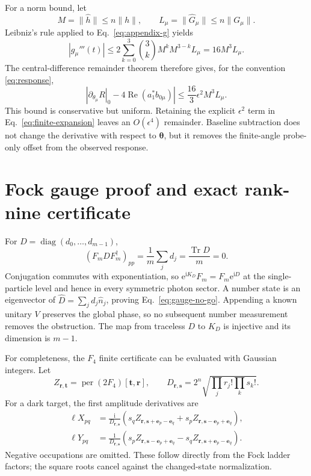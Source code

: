 \documentclass[aps,pra,reprint,amsmath,amssymb,superscriptaddress,longbibliography]{revtex4-2}
\newcommand{\ii}{\mathrm{i}}
\newcommand{\ee}{\mathrm{e}}
\newcommand{\per}{\operatorname{per}}
\newcommand{\Tr}{\operatorname{Tr}}
\newcommand{\btheta}{\bm{\theta}}
\newcommand{\be}{\bm e}
\begin{document}
For a norm bound, let
\begin{equation}
 M=\|\widehat h\|\leq n\|h\|,\qquad
 L_\mu=\|\widehat G_\mu\|\leq n\|G_\mu\|.
\end{equation}
Leibniz's rule applied to Eq.~\eqref{eq:appendix-g} yields
\begin{equation}
 |g_\mu'''(t)|
 \leq2\sum_{k=0}^{3}\binom3kM^kM^{3-k}L_\mu
 =16M^3L_\mu .
\end{equation}
The central-difference remainder theorem therefore gives, for the
convention \eqref{eq:response},
\begin{equation}
 \left|
 \left.\partial_{\theta_\mu}R\right|_0
 -4\operatorname{Re}(a_1^*b_{0\mu})
 \right|
 \leq\frac{16}{3}\epsilon^2M^3L_\mu .
\label{eq:finite-bound}
\end{equation}
This bound is conservative but uniform.  Retaining the explicit
$\epsilon^2$ term in Eq.~\eqref{eq:finite-expansion} leaves an
$O(\epsilon^4)$ remainder.  Baseline subtraction does not change the
derivative with respect to $\btheta$, but it removes the finite-angle
probe-only offset from the observed response.

\section{Fock gauge proof and exact rank-nine certificate}
\label{app:fock-certificate}

For $D=\operatorname{diag}(d_0,\ldots,d_{m-1})$,
\begin{equation}
 (F_mDF_m^\dagger)_{pp}
 =\frac1m\sum_jd_j=\frac{\Tr D}{m}=0.
\end{equation}
Conjugation commutes with exponentiation, so
$\ee^{\ii K_D}F_m=F_m\ee^{\ii D}$ at the single-particle level and hence
in every symmetric photon sector.  A number state is an eigenvector of
$\widehat D=\sum_jd_j\widehat n_j$, proving
Eq.~\eqref{eq:gauge-no-go}.  Appending a known unitary $V$ preserves the
global phase, so no subsequent number measurement removes the
obstruction.  The map from traceless $D$ to $K_D$ is injective and its
dimension is $m-1$.

For completeness, the $F_4$ finite certificate can be evaluated with
Gaussian integers.  Let
\begin{equation}
 Z_{\bm r,\bm t}=\per(2F_4)[\bm t,\bm r],\qquad
 D_{\bm r,\bm s}=2^n
 \sqrt{\prod_jr_j!\prod_ks_k!}.
\end{equation}
For a dark target, the first amplitude derivatives are
\begin{align}
 \ell X_{pq}
 &=\frac{\ii}{D_{\bm r,\bm s}}
 \left(s_qZ_{\bm r,\bm s+\be_p-\be_q}
 +s_pZ_{\bm r,\bm s-\be_p+\be_q}\right),\nonumber\\
 \ell Y_{pq}
 &=\frac{1}{D_{\bm r,\bm s}}
 \left(s_pZ_{\bm r,\bm s-\be_p+\be_q}
 -s_qZ_{\bm r,\bm s+\be_p-\be_q}\right).
\label{eq:neighboring-permanents}
\end{align}
Negative occupations are omitted.  These follow directly from the Fock
ladder factors; the square roots cancel against the changed-state
normalization.
\end{document}
